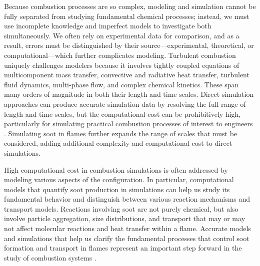 \documentclass[preprint,12pt, a4paper]{elsarticle}
\begin{document}
Because combustion processes are so complex, modeling and simulation cannot be fully separated from studying fundamental chemical processes; instead, we must use incomplete knowledge and imperfect models to investigate both simultaneously. We often rely on experimental data for comparison,
and as a result, errors must be distinguished by their source---experimental,
theoretical, or computational---which further complicates modeling. Turbulent combustion uniquely challenges modelers because it involves tightly coupled equations of multicomponent mass transfer, convective and radiative heat transfer, turbulent fluid dynamics, multi-phase flow, and complex chemical kinetics. These span many orders of magnitude in both their length and time scales. Direct simulation approaches can produce accurate simulation data by resolving the full range of length and time scales, but the computational cost can be prohibitively high, particularly for simulating practical combustion processes of interest to engineers \cite{Pope_2000,Bernard_2002}. Simulating soot in flames further expands the range of scales that must be considered, adding additional complexity and computational cost to direct simulations.

High computational cost in combustion simulations is often addressed by modeling various aspects of the configuration. In particular, computational models that quantify soot production in simulations can help us study its fundamental behavior and distinguish between various reaction mechanisms and transport models. Reactions involving soot are not purely chemical, but also involve particle aggregation, size distributions, and transport that may or may not affect molecular reactions and heat transfer within a flame. Accurate models and simulations that help us clarify the fundamental processes that control soot formation and transport in flames represent an important step forward in the study of combustion systems \cite{Frenklach_2002b}. 
\end{document}

